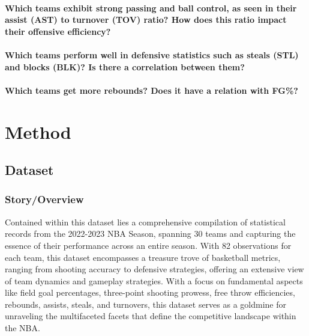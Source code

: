 \documentclass[conference]{IEEEtran}
\begin{document}
\paragraph {Which teams exhibit strong passing and ball control, as seen in their assist (AST) to turnover (TOV) ratio? How does this ratio impact their offensive efficiency? }
\vspace{\baselineskip}

\paragraph {Which teams perform well in defensive statistics such as steals (STL) and blocks (BLK)? Is there a correlation between them? }

\vspace{\baselineskip}
\paragraph {Which teams get more rebounds? Does it have a relation with FG\%? }
\vspace{\baselineskip}

\section{Method}
\subsection{Dataset}
\subsubsection{Story/Overview}
Contained within this dataset lies a comprehensive compilation of statistical records from the 2022-2023 NBA Season, spanning 30 teams and capturing the essence of their performance across an entire season. With 82 observations for each team, this dataset encompasses a treasure trove of basketball metrics, ranging from shooting accuracy to defensive strategies, offering an extensive view of team dynamics and gameplay strategies. With a focus on fundamental aspects like field goal percentages, three-point shooting prowess, free throw efficiencies, rebounds, assists, steals, and turnovers, this dataset serves as a goldmine for unraveling the multifaceted facets that define the competitive landscape within the NBA. 
\vspace{\baselineskip}
\vspace{\baselineskip}
\vspace{\baselineskip}
\end{document}
